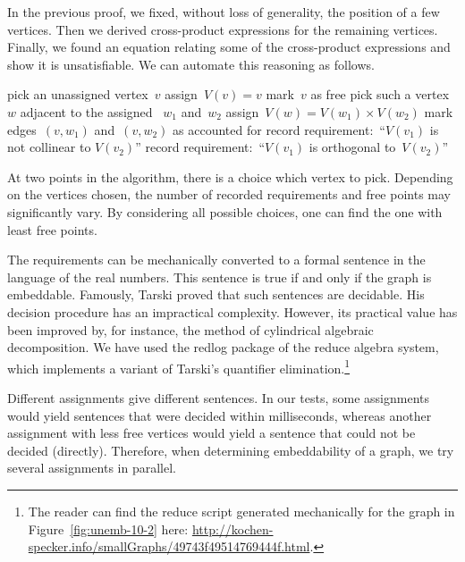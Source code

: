 \documentclass{report}
\begin{document}
In the previous proof, we fixed, without loss of generality, the position
of a few vertices.  Then we derived cross-product expressions for the
remaining vertices.  Finally, we found an equation relating some of
the cross-product expressions and show it is unsatisfiable.
We can automate this reasoning as follows.

\begin{algorithmic}[5]
        \State pick an unassigned vertex~$v$
        \State assign~$V(v)=v$ 
        \State mark~$v$ as free
            \State pick such a vertex~$w$ adjacent to the
                    assigned ~$w_1$ and~$w_2$
            \State assign~$V(w)=V(w_1) \times V(w_2)$
            \State mark edges~$(v,w_1)$ and~$(v,w_2)$ as accounted for
        \EndWhile
    \EndWhile
    \pagebreak[2]
            \State record requirement:~``$V(v_1)$
                    is not collinear to $V(v_2)$''
        \EndIf
    \EndFor
        \State record requirement:~``$V(v_1)$ is orthogonal to~$V(v_2)$''
    \EndFor
\end{algorithmic}

At two points in the algorithm, there is a choice which vertex to pick.
Depending on the vertices chosen, the number of recorded requirements
and free points may significantly vary. By considering all possible choices,
one can find the one with least free points.

The requirements can be mechanically converted
to a formal sentence
in the language of the real numbers.
This sentence is true if and only if the graph is embeddable.
Famously, Tarski proved\cite{tarski}
that such sentences are decidable.
His decision procedure has an impractical complexity.
However, its practical value has been improved
by, for instance, the method of cylindrical algebraic decomposition\cite{qecad}.
We have used the redlog\cite{redlog} package of the reduce algebra
system, which implements a variant of Tarski's quantifier
elimination.\footnote{%
    The reader can find the reduce script generated mechanically
    for the graph in Figure~\ref{fig:unemb-10-2} here:
    \url{http://kochen-specker.info/smallGraphs/49743f49514769444f.html}.  }

Different assignments give different sentences.  In our tests,
some assignments would yield sentences that were decided within milliseconds,
whereas another assignment with less free vertices would
yield a sentence that could not be decided (directly).
Therefore, when determining embeddability of a graph,
we try several assignments in parallel.
\end{document}
